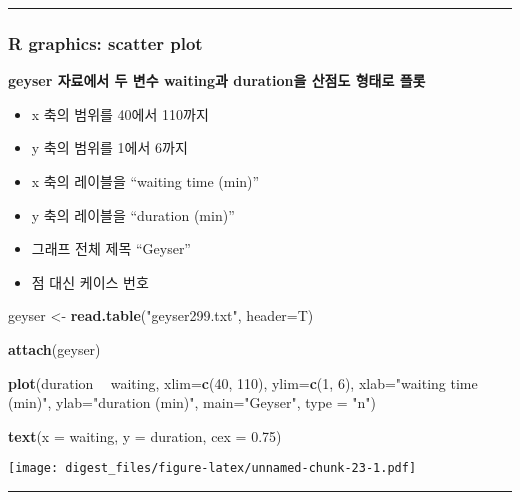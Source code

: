\documentclass[]{article}
\newenvironment{Shaded}{\begin{snugshade}}{\end{snugshade}}
\newcommand{\KeywordTok}[1]{\textcolor[rgb]{0.13,0.29,0.53}{\textbf{#1}}}
\newcommand{\DataTypeTok}[1]{\textcolor[rgb]{0.13,0.29,0.53}{#1}}
\newcommand{\DecValTok}[1]{\textcolor[rgb]{0.00,0.00,0.81}{#1}}
\newcommand{\FloatTok}[1]{\textcolor[rgb]{0.00,0.00,0.81}{#1}}
\newcommand{\StringTok}[1]{\textcolor[rgb]{0.31,0.60,0.02}{#1}}
\newcommand{\OperatorTok}[1]{\textcolor[rgb]{0.81,0.36,0.00}{\textbf{#1}}}
\newcommand{\NormalTok}[1]{#1}
\providecommand{\tightlist}{%
  \setlength{\itemsep}{0pt}\setlength{\parskip}{0pt}}
\begin{document}
\begin{center}\rule{0.5\linewidth}{\linethickness}\end{center}

\subsubsection{R graphics: scatter plot}\label{r-graphics-scatter-plot}

\textbf{geyser 자료에서 두 변수 waiting과 duration을 산점도 형태로 플롯}

\begin{itemize}
\tightlist
\item
  x 축의 범위를 40에서 110까지
\item
  y 축의 범위를 1에서 6까지
\item
  x 축의 레이블을 ``waiting time (min)''
\item
  y 축의 레이블을 ``duration (min)''
\item
  그래프 전체 제목 ``Geyser''
\item
  점 대신 케이스 번호
\end{itemize}

\begin{Shaded}
\begin{Highlighting}[]
\NormalTok{geyser <-}\StringTok{ }\KeywordTok{read.table}\NormalTok{(}\StringTok{"geyser299.txt"}\NormalTok{, }\DataTypeTok{header=}\NormalTok{T)}

\KeywordTok{attach}\NormalTok{(geyser)}

\KeywordTok{plot}\NormalTok{(duration }\OperatorTok{~}\StringTok{ }\NormalTok{waiting, }\DataTypeTok{xlim=}\KeywordTok{c}\NormalTok{(}\DecValTok{40}\NormalTok{, }\DecValTok{110}\NormalTok{), }\DataTypeTok{ylim=}\KeywordTok{c}\NormalTok{(}\DecValTok{1}\NormalTok{, }\DecValTok{6}\NormalTok{), }\DataTypeTok{xlab=}\StringTok{"waiting time (min)"}\NormalTok{, }\DataTypeTok{ylab=}\StringTok{"duration (min)"}\NormalTok{, }\DataTypeTok{main=}\StringTok{"Geyser"}\NormalTok{, }\DataTypeTok{type =} \StringTok{"n"}\NormalTok{)}

\KeywordTok{text}\NormalTok{(}\DataTypeTok{x =}\NormalTok{ waiting, }\DataTypeTok{y =}\NormalTok{ duration, }\DataTypeTok{cex =} \FloatTok{0.75}\NormalTok{)}
\end{Highlighting}
\end{Shaded}

\texttt{[image: digest\_files/figure-latex/unnamed-chunk-23-1.pdf]}

\begin{center}\rule{0.5\linewidth}{\linethickness}\end{center}
\end{document}
